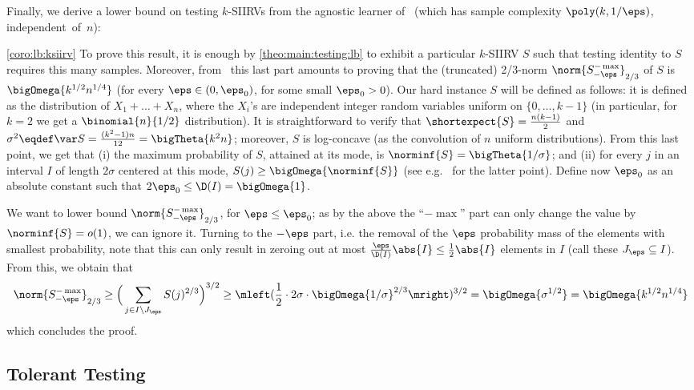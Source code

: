 \noindent Finally, we derive a lower bound on testing $k$-SIIRVs from the agnostic learner of~\cite{DDDOST:13} (which has sample complexity $\poly(k,1/\eps)$, independent~of~$n$):
\corolbksiirv*
\begin{proofof}{\cref{coro:lb:ksiirv}}
To prove this result, it is enough by \cref{theo:main:testing:lb} to exhibit a particular $k$-SIIRV $S$ such that testing identity to $S$ requires this many samples. Moreover, from~\cite{VV:14} this last part amounts to proving that the (truncated) 2/3-norm $\norm{S^{-\max}_{-\eps}}_{2/3}$ of $S$ is $\bigOmega{k^{1/2}n^{1/4}}$ (for every $\eps\in(0,\eps_0)$, for some small $\eps_0>0$). Our hard instance $S$ will be defined as follows: it is defined as the distribution of $X_1+\dots+X_n$, where the $X_i$'s are independent integer random variables uniform on $\{0,\dots,k-1\}$ (in particular, for $k=2$ we get a $\binomial{n}{1/2}$ distribution). It is straightforward to verify that $\shortexpect{S} = \frac{n(k-1)}{2}$ and $\sigma^2\eqdef\var S = \frac{(k^2-1)n}{12} = \bigTheta{k^2 n}$; moreover, $S$ is log-concave (as the convolution of $n$ uniform distributions). From this last point, we get that \textsf{(i)} the maximum probability of $S$, attained at its mode, is $\norminf{S}=\bigTheta{1/\sigma}$; and \textsf{(ii)} for every $j$ in an interval $I$ of length $2\sigma$ centered at this mode, $S(j) \geq \bigOmega{\norminf{S}}$ (see e.g.~\cite[Lemma 5.7]{DKS:15:arXiv} for the latter point). Define now $\eps_0$ as an absolute constant such that  $2\eps_0 \leq \D(I) = \bigOmega{1}$.

We want to lower bound $\norm{S^{-\max}_{-\eps}}_{2/3}$, for $\eps\leq \eps_0$; as by the above the ``$-\max$'' part can only change the value by $\norminf{S}=o(1)$, we can ignore it. Turning to the $-\eps$ part, i.e. the removal of the $\eps$ probability mass of the elements with smallest probability, note that this can only result in zeroing out at most $\frac{\eps}{\D(I)}\abs{I}\leq \frac{1}{2}\abs{I}$ elements in $I$ (call these $J_\eps\subseteq I$). From this, we obtain that
\[
    \norm{S^{-\max}_{-\eps}}_{2/3}\geq \Big(\sum_{j\in I\setminus J_\eps} S(j)^{2/3}\Big)^{3/2} \geq \mleft(\frac{1}{2}\cdot 2\sigma\cdot \bigOmega{1/\sigma}^{2/3}\mright)^{3/2} =\bigOmega{\sigma^{1/2}} = \bigOmega{k^{1/2}n^{1/4}}
\]
which concludes the proof.
\end{proofof}

\subsection{Tolerant Testing}\label{sec:lowerbounds:tol}

